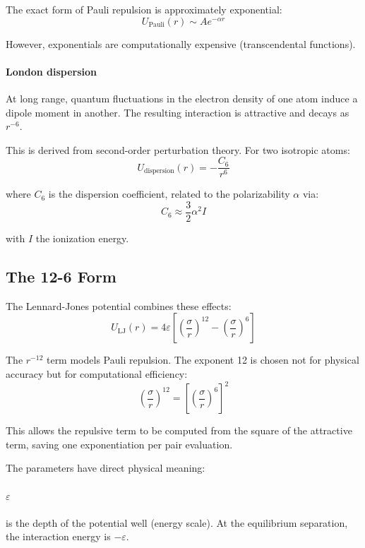 \documentclass[11pt]{article}
\begin{document}
The exact form of Pauli repulsion is approximately exponential:
\begin{equation}
U_{\text{Pauli}}(r) \sim A e^{-\alpha r}
\end{equation}

However, exponentials are computationally expensive (transcendental functions).

\paragraph{London dispersion} At long range, quantum fluctuations in the electron density of one atom induce a dipole moment in another. The resulting interaction is attractive and decays as $r^{-6}$.

This is derived from second-order perturbation theory. For two isotropic atoms:
\begin{equation}
U_{\text{dispersion}}(r) = -\frac{C_6}{r^6}
\end{equation}

where $C_6$ is the dispersion coefficient, related to the polarizability $\alpha$ via:
\begin{equation}
C_6 \approx \frac{3}{2} \alpha^2 I
\end{equation}

with $I$ the ionization energy.

\subsection{The 12-6 Form}

The Lennard-Jones potential combines these effects:
\begin{equation}
U_{\text{LJ}}(r) = 4\varepsilon \left[\left(\frac{\sigma}{r}\right)^{12} - \left(\frac{\sigma}{r}\right)^6\right]
\end{equation}

The $r^{-12}$ term models Pauli repulsion. The exponent 12 is chosen not for physical accuracy but for computational efficiency:
\begin{equation}
\left(\frac{\sigma}{r}\right)^{12} = \left[\left(\frac{\sigma}{r}\right)^6\right]^2
\end{equation}

This allows the repulsive term to be computed from the square of the attractive term, saving one exponentiation per pair evaluation.

The parameters have direct physical meaning:

\paragraph{$\varepsilon$} is the depth of the potential well (energy scale). At the equilibrium separation, the interaction energy is $-\varepsilon$.
\end{document}

